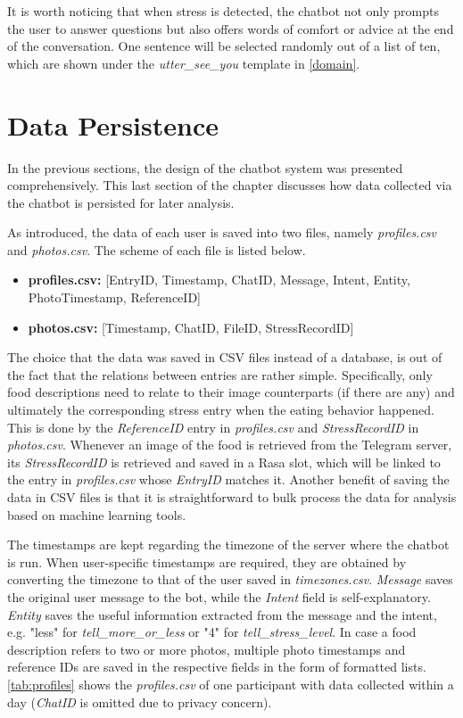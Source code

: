 It is worth noticing that when stress is detected, the chatbot not only prompts the user to answer questions but also offers words of comfort or advice at the end of the conversation. One sentence will be selected randomly out of a list of ten, which are shown under the \emph{utter\_see\_you} template in \autoref{domain}.

\section{Data Persistence} \label{data_persis}
In the previous sections, the design of the chatbot system was presented comprehensively. This last section of the chapter discusses how data collected via the chatbot is persisted for later analysis.

As introduced, the data of each user is saved into two files, namely \emph{profiles.csv} and \emph{photos.csv}. The scheme of each file is listed below.

\begin{itemize}
  \item \textbf{profiles.csv:} [EntryID, Timestamp, ChatID, Message, Intent, Entity, PhotoTimestamp, ReferenceID]
  \item \textbf{photos.csv:} [Timestamp, ChatID, FileID, StressRecordID]
\end{itemize}

The choice that the data was saved in CSV files instead of a database, is out of the fact that the relations between entries are rather simple. Specifically, only food descriptions need to relate to their image counterparts (if there are any) and ultimately the corresponding stress entry when the eating behavior happened. This is done by the \emph{ReferenceID} entry in \emph{profiles.csv} and \emph{StressRecordID} in \emph{photos.csv}. Whenever an image of the food is retrieved from the Telegram server, its \emph{StressRecordID} is retrieved and saved in a Rasa slot, which will be linked to the entry in \emph{profiles.csv} whose \emph{EntryID} matches it. Another benefit of saving the data in CSV files is that it is straightforward to bulk process the data for analysis based on machine learning tools.

The timestamps are kept regarding the timezone of the server where the chatbot is run. When user-specific timestamps are required, they are obtained by converting the timezone to that of the user saved in \emph{timezones.csv}. \emph{Message} saves the original user message to the bot, while the \emph{Intent} field is self-explanatory. \emph{Entity} saves the useful information extracted from the message and the intent, e.g. "less" for \emph{tell\_more\_or\_less} or "4" for \emph{tell\_stress\_level}. In case a food description refers to two or more photos, multiple photo timestamps and reference IDs are saved in the respective fields in the form of formatted lists. \autoref{tab:profiles} shows the \emph{profiles.csv} of one participant with data collected within a day (\emph{ChatID} is omitted due to privacy concern).

